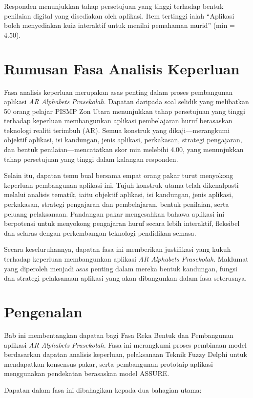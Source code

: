 {{Responden menunjukkan tahap persetujuan yang tinggi terhadap bentuk penilaian digital yang disediakan oleh aplikasi. Item tertinggi ialah “Aplikasi boleh menyediakan kuiz interaktif untuk menilai pemahaman murid” (min = 4.50).
\section{Rumusan Fasa Analisis Keperluan}

Fasa analisis keperluan merupakan asas penting dalam proses pembangunan aplikasi \textit{AR Alphabets Prasekolah}. Dapatan daripada soal selidik yang melibatkan 50 orang pelajar PISMP Zon Utara menunjukkan tahap persetujuan yang tinggi terhadap keperluan membangunkan aplikasi pembelajaran huruf berasaskan teknologi realiti terimbuh (AR). Semua konstruk yang dikaji—merangkumi objektif aplikasi, isi kandungan, jenis aplikasi, perkakasan, strategi pengajaran, dan bentuk penilaian—mencatatkan skor min melebihi 4.00, yang menunjukkan tahap persetujuan yang tinggi dalam kalangan responden.

Selain itu, dapatan temu bual bersama empat orang pakar turut menyokong keperluan pembangunan aplikasi ini. Tujuh konstruk utama telah dikenalpasti melalui analisis tematik, iaitu objektif aplikasi, isi kandungan, jenis aplikasi, perkakasan, strategi pengajaran dan pembelajaran, bentuk penilaian, serta peluang pelaksanaan. Pandangan pakar mengesahkan bahawa aplikasi ini berpotensi untuk menyokong pengajaran huruf secara lebih interaktif, fleksibel dan selaras dengan perkembangan teknologi pendidikan semasa.

Secara keseluruhannya, dapatan fasa ini memberikan justifikasi yang kukuh terhadap keperluan membangunkan aplikasi \textit{AR Alphabets Prasekolah}. Maklumat yang diperoleh menjadi asas penting dalam mereka bentuk kandungan, fungsi dan strategi pelaksanaan aplikasi yang akan dibangunkan dalam fasa seterusnya.
\section{Pengenalan}

Bab ini membentangkan dapatan bagi Fasa Reka Bentuk dan Pembangunan aplikasi \textit{AR Alphabets Prasekolah}. Fasa ini merangkumi proses pembinaan model berdasarkan dapatan analisis keperluan, pelaksanaan Teknik Fuzzy Delphi untuk mendapatkan konsensus pakar, serta pembangunan prototaip aplikasi menggunakan pendekatan berasaskan model ASSURE.

Dapatan dalam fasa ini dibahagikan kepada dua bahagian utama:

}}

